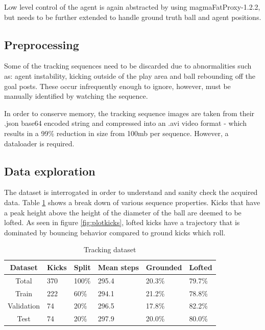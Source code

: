 \documentclass[a4paper,twoside,12pt]{report}
\begin{document}
Low level control of the agent is again abstracted by using magmaFatProxy-1.2.2, but needs to be further extended to handle ground truth ball and agent positions. 

\subsection{Preprocessing}

Some of the tracking sequences need to be discarded due to abnormalities such as: agent instability, kicking outside of the play area and ball rebounding off the goal posts. These occur infrequently enough to ignore, however, must be manually identified by watching the sequence. 

In order to conserve memory, the tracking sequence images are taken from their .json base64 encoded string and compressed into an .avi video format - which results in a 99\% reduction in size from 100mb per sequence. However, a dataloader is required.

\subsection{Data exploration}

The dataset is interrogated in order to understand and sanity check the acquired data. Table \ref{tab:tracking} shows a break down of various sequence properties. Kicks that have a peak height above the height of the diameter of the ball are deemed to be lofted. As seen in figure \ref{fig:plotkicks}, lofted kicks have a trajectory that is dominated by bouncing behavior compared to ground kicks which roll.

\begin{table}[h!]
\fontsize{9.5pt}{12pt}\selectfont
\centering
\begin{tabular}{c|ll|l|ll}
{\bf Dataset}	&{\bf Kicks}	&{\bf Split}	&{\bf Mean steps}	&{\bf Grounded}	&{\bf Lofted}	\\\hline
Total			&370			&100\%			&295.4			&20.3\%			&79.7\%			\\\hline   
Train			&222			&60\%			&294.1			&21.2\%			&78.8\%			\\\hline  
Validation		&74				&20\%			&296.5			&17.8\%			&82.2\%			\\\hline  
Test			&74				&20\%			&297.9			&20.0\%			&80.0\%			\\\hline                        
\end{tabular}
\caption{Tracking dataset}
\label{tab:tracking}
\end{table}
\end{document}
